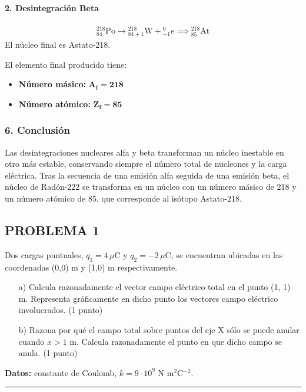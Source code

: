 \paragraph*{2. Desintegración Beta}
\begin{gather}
    {}_{84}^{218}\text{Po} \longrightarrow {}_{84+1}^{218}\text{W} + {}_{-1}^{0}e \implies {}_{85}^{218}\text{At}
\end{gather}
El núcleo final es Astato-218.

\begin{cajaresultado}
    El elemento final producido tiene:
    \begin{itemize}
        \item \textbf{Número másico:} $\boldsymbol{A_f = 218}$
        \item \textbf{Número atómico:} $\boldsymbol{Z_f = 85}$
    \end{itemize}
\end{cajaresultado}

\subsubsection*{6. Conclusión}
\begin{cajaconclusion}
Las desintegraciones nucleares alfa y beta transforman un núcleo inestable en otro más estable, conservando siempre el número total de nucleones y la carga eléctrica. Tras la secuencia de una emisión alfa seguida de una emisión beta, el núcleo de Radón-222 se transforma en un núcleo con un número másico de 218 y un número atómico de 85, que corresponde al isótopo Astato-218.
\end{cajaconclusion}

\newpage
\subsection{PROBLEMA 1}
\label{subsec:P1_2024_jun_ord}

\begin{cajaenunciado}
Dos cargas puntuales, $q_{1}=4\,\mu\text{C}$ y $q_{2}=-2\,\mu\text{C}$, se encuentran ubicadas en las coordenadas (0,0) m y (1,0) m respectivamente.
\begin{enumerate}
    \item[a)] Calcula razonadamente el vector campo eléctrico total en el punto (1, 1) m. Representa gráficamente en dicho punto los vectores campo eléctrico involucrados. (1 punto)
    \item[b)] Razona por qué el campo total sobre puntos del eje X sólo se puede anular cuando $x>1$ m. Calcula razonadamente el punto en que dicho campo se anula. (1 punto)
\end{enumerate}
\textbf{Datos:} constante de Coulomb, $k=9\cdot10^{9}$ N m$^2$C$^{-2}$.
\end{cajaenunciado}
\hrule
